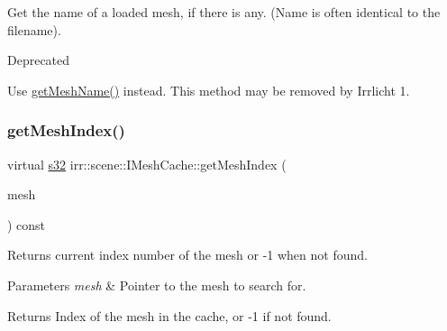 Get the name of a loaded mesh, if there is any. (Name is often identical to the filename). 

\begin{DoxyRefDesc}{Deprecated}
\item[\hyperlink{deprecated__deprecated000011}{Deprecated}]Use \hyperlink{classirr_1_1scene_1_1IMeshCache_af06efb8fb21f6bba16e52d879b5d3ddd}{get\+Mesh\+Name()} instead. This method may be removed by Irrlicht 1. \end{DoxyRefDesc}
\mbox{\label{classirr_1_1scene_1_1IMeshCache_a2b3512bd3ff11d0b290fa5d2d580eb54}} 
\subsubsection{\texorpdfstring{get\+Mesh\+Index()}{getMeshIndex()}}
{\footnotesize\ttfamily virtual \hyperlink{namespaceirr_ac66849b7a6ed16e30ebede579f9b47c6}{s32} irr\+::scene\+::\+I\+Mesh\+Cache\+::get\+Mesh\+Index (\begin{DoxyParamCaption}\item[{const \hyperlink{classirr_1_1scene_1_1IMesh}{I\+Mesh} $\ast$const}]{mesh }\end{DoxyParamCaption}) const\hspace{0.3cm}{\ttfamily [pure virtual]}}



Returns current index number of the mesh or -\/1 when not found. 


\begin{DoxyParams}{Parameters}
{\em mesh} & Pointer to the mesh to search for. \\
\hline
\end{DoxyParams}
\begin{DoxyReturn}{Returns}
Index of the mesh in the cache, or -\/1 if not found. 
\end{DoxyReturn}
\mbox{\label{classirr_1_1scene_1_1IMeshCache_af06efb8fb21f6bba16e52d879b5d3ddd}} 
